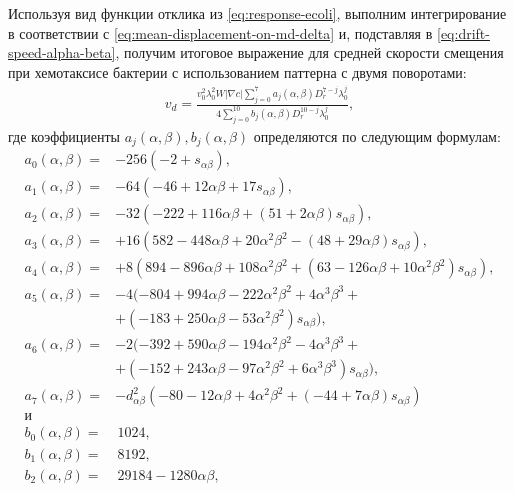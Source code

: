 Используя вид функции отклика из \cref{eq:response-ecoli}, выполним интегрирование в соответствии с \cref{eq:mean-displacement-on-md-delta} и, подставляя в \cref{eq:drift-speed-alpha-beta}, получим итоговое выражение для средней скорости смещения при хемотаксисе бактерии с использованием паттерна с двумя поворотами:
\begin{equation}
    \begin{aligned}
        v_d=\frac{v_0^2\lambda_0^2W|\nabla c|\sum_{j=0}^{7} a_j(\alpha, \beta)D_r^{7-j}\lambda_0^j}{4\sum_{j=0}^{10}b_j(\alpha,\beta)D_r^{10-j}\lambda_0^j},
        \label{eq:drift-speed-solution}
    \end{aligned}
\end{equation}
где коэффициенты $a_j(\alpha,\beta), b_j(\alpha,\beta)$ определяются по следующим формулам:
\begin{equation}
    \begin{aligned}
	a_0(\alpha, \beta) =& - 256\left (-2+s_{\alpha\beta}\right ), \\
	a_1(\alpha, \beta) =& - 64\left (-46+12\alpha\beta+17s_{\alpha\beta}\right ), \\
	a_2(\alpha, \beta) =& - 32\left (-222+116\alpha\beta+(51+2\alpha\beta)s_{\alpha\beta}\right ), \\
	a_3(\alpha, \beta) =& +16\left ( 582-448\alpha\beta+20\alpha^2\beta^2-(48+29\alpha\beta)s_{\alpha\beta} \right ), \\
	a_4(\alpha, \beta) =& +8\left ( 894-896\alpha\beta+108\alpha^2\beta^2+(63-126\alpha\beta+10\alpha^2\beta^2)s_{\alpha\beta} \right ), \\
	a_5(\alpha, \beta) =& - 4( -804+994\alpha\beta-222\alpha^2\beta^2+4\alpha^3\beta^3+\\
    &+(-183+250\alpha\beta-53\alpha^2\beta^2)s_{\alpha\beta} ), \\
	a_6(\alpha, \beta) =& - 2( -392+590\alpha\beta-194\alpha^2\beta^2-4\alpha^3\beta^3+\\
    &+(-152+243\alpha\beta-97\alpha^2\beta^2+6\alpha^3\beta^3)s_{\alpha\beta} ), \\
	a_7(\alpha, \beta) =& - d_{\alpha\beta}^2\left ( -80-12\alpha\beta+4\alpha^2\beta^2+(-44+7\alpha\beta)s_{\alpha\beta} \right )\\
    \textrm{и}\\
	b_0(\alpha, \beta) =&\, 1024, \\
	b_1(\alpha, \beta) =&\, 8192, \\
	b_2(\alpha, \beta) =&\, 29184 - 1280\alpha\beta, \\

\end{aligned}
\end{equation}
